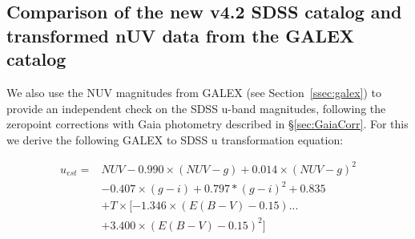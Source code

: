 \documentclass[fleqn,usenatbib]{mnras}
\begin{document}
\subsection{Comparison of the new v4.2 SDSS catalog and transformed nUV data from the GALEX catalog  \label{sec:Galextest}} 

We also use the NUV magnitudes from GALEX (see
Section~\ref{ssec:galex}) to provide an independent check on the SDSS
u-band magnitudes, following the zeropoint corrections with Gaia
photometry described in \S \ref{sec:GaiaCorr}. For this we derive the
following GALEX to SDSS u transformation equation:

\begin{equation}
\begin{split}
u_{est} = & NUV - 0.990\times(NUV - g) + 0.014\times(NUV  - g)^2  \\
         & -0.407\times(g - i) + 0.797*(g - i)^2 + 0.835  \\
         & + T \times [ -1.346\times(E(B-V)-0.15) ... \\
         & + 3.400\times(E(B-V)-0.15)^{2} ] \\
\end{split}
\end{equation}
\end{document}
